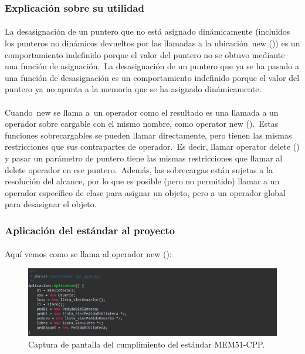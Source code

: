		\subsubsection{Explicación sobre su utilidad}
		
			\paragraph{}La desasignación de un puntero que no está asignado dinámicamente (incluidos los punteros no dinámicos devueltos por las llamadas a la ubicación new ()) es un comportamiento indefinido porque el valor del puntero no se obtuvo mediante una función de asignación. La desasignación de un puntero que ya se ha pasado a una función de desasignación es un comportamiento indefinido porque el valor del puntero ya no apunta a la memoria que se ha asignado dinámicamente.
			
			\paragraph{}Cuando new se llama a un operador como el resultado es una llamada a un operador sobre cargable con el mismo nombre, como operator new (). Estas funciones sobrecargables se pueden llamar directamente, pero tienen las mismas restricciones que sus contrapartes de operador. Es decir, llamar operator delete () y pasar un parámetro de puntero tiene las mismas restricciones que llamar al delete operador en ese puntero. Además, las sobrecargas están sujetas a la resolución del alcance, por lo que es posible (pero no permitido) llamar a un operador específico de clase para asignar un objeto, pero a un operador global para desasignar el objeto.
		
		\subsubsection{Aplicación del estándar al proyecto}
		
			\paragraph{}Aquí vemos como se llama al operador new ():
			
			\begin{figure}[H]
				\centering
				\includegraphics[scale=0.8]{img/img3.png}
				\caption{Captura de pantalla del cumplimiento del estándar MEM51-CPP.}
				\label{img3}
			\end{figure}
			
